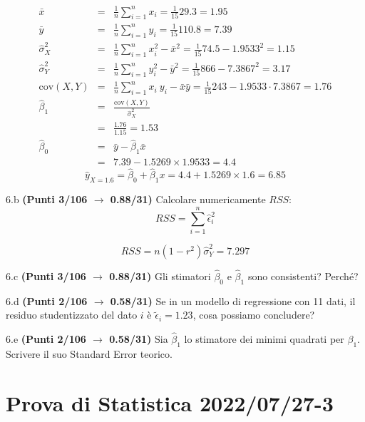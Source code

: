 \documentclass[
  11pt,
]{book}
\theoremstyle{mytheoremstyle}
\theoremstyle{mydefstyle}
\newenvironment{sol}
  {
  \begin{tcolorbox}[enhanced,breakable,arc=0.1mm,boxrule=1pt,colback=white,colframe=iblue,
  title=\bf \fontfamily{lmss}\selectfont \hspace{.5 cm} Soluzione,drop fuzzy shadow]

}{
\end{tcolorbox}
  }
\begin{document}
\begin{sol}
\begin{eqnarray*}
           \bar x &=&\frac 1 n\sum_{i=1}^n x_i = \frac {1}{ 15 }  29.3 =  1.95 \\
           \bar y &=&\frac 1 n\sum_{i=1}^n y_i = \frac {1}{ 15 }  110.8 =  7.39 \\
           \hat\sigma_X^2&=&\frac 1 n\sum_{i=1}^n x_i^2-\bar x^2=\frac {1}{ 15 }  74.5  - 1.9533 ^2= 1.15 \\
           \hat\sigma_Y^2&=&\frac 1 n\sum_{i=1}^n y_i^2-\bar y^2=\frac {1}{ 15 }  866  - 7.3867 ^2= 3.17 \\
           \text{cov}(X,Y)&=&\frac 1 n\sum_{i=1}^n x_i~y_i-\bar x\bar y=\frac {1}{ 15 }  243 - 1.9533 \cdot 7.3867 = 1.76 \\
           \hat\beta_1 &=& \frac{\text{cov}(X,Y)}{\hat\sigma_X^2} \\
                    &=& \frac{ 1.76 }{ 1.15 }  =  1.53 \\
           \hat\beta_0 &=& \bar y - \hat\beta_1 \bar x\\
                    &=&  7.39 - 1.5269 \times  1.9533 = 4.4 
         \end{eqnarray*}\[\hat y_{X= 1.6 }=\hat\beta_0+\hat\beta_1 x= 4.4 + 1.5269 \times 1.6 = 6.85 \]

\end{sol}

6.b \textbf{(Punti 3/106 \(\rightarrow\) 0.88/31)} Calcolare numericamente \(RSS\):
\[
RSS=\sum_{i=1}^n \hat\epsilon_i^2
\]

\begin{sol}
\[RSS=n(1-r^2)\hat\sigma_Y^2=7.297\]

\end{sol}

6.c \textbf{(Punti 3/106 \(\rightarrow\) 0.88/31)} Gli stimatori \(\hat\beta_0\) e \(\hat\beta_1\) sono consistenti?
Perché?

6.d \textbf{(Punti 2/106 \(\rightarrow\) 0.58/31)} Se in un modello di regressione con 11 dati,
il residuo studentizzato del dato \(i\) è \(\tilde \epsilon_i=1.23\), cosa possiamo concludere?

6.e \textbf{(Punti 2/106 \(\rightarrow\) 0.58/31)} Sia \(\hat\beta_1\) lo stimatore dei minimi quadrati per \(\beta_1\).
Scrivere il suo Standard Error teorico.

\section{Prova di Statistica 2022/07/27-3}\label{prova-di-statistica-20220727-3}
\end{document}
